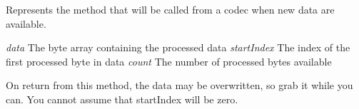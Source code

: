 Represents the method that will be called from a codec when new data are available. 

{\itshape data} The byte array containing the processed data {\itshape start\+Index} The index of the first processed byte in {\ttfamily data} {\itshape count} The number of processed bytes available 

On return from this method, the data may be overwritten, so grab it while you can. You cannot assume that start\+Index will be zero. 